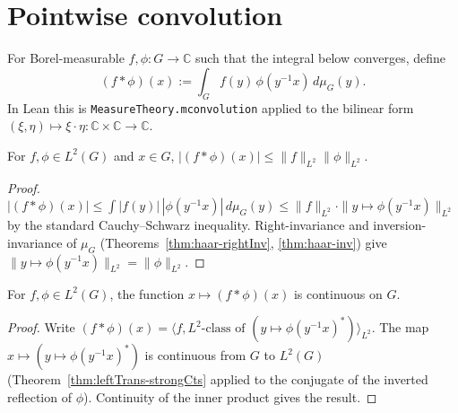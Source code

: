 \section{Pointwise convolution}

\begin{definition}
  \label{def:conv-ptwise}
  \leanok
  For Borel-measurable $f, \phi : G \to \mathbb C$ such that the integral
  below converges, define
  \[
     (f * \phi)(x) := \int_G f(y)\, \phi(y^{-1} x)\, d\mu_G(y).
  \]
  In Lean this is \texttt{MeasureTheory.mconvolution} applied to the
  bilinear form $(\xi, \eta) \mapsto \xi \cdot \eta : \mathbb C \times \mathbb C \to \mathbb C$.
\end{definition}

\begin{theorem}
  \label{thm:conv-CS}
  For $f, \phi \in L^2(G)$ and $x \in G$,
  $|(f*\phi)(x)| \leq \|f\|_{L^2}\|\phi\|_{L^2}$.
\end{theorem}

\begin{proof}
  $|(f*\phi)(x)| \leq \int |f(y)|\,|\phi(y^{-1}x)|\,d\mu_G(y)
    \leq \|f\|_{L^2} \cdot \|y\mapsto \phi(y^{-1}x)\|_{L^2}$
  by the standard Cauchy--Schwarz inequality.
  Right-invariance and inversion-invariance of $\mu_G$
  (Theorems~\ref{thm:haar-rightInv}, \ref{thm:haar-inv}) give
  $\|y \mapsto \phi(y^{-1}x)\|_{L^2} = \|\phi\|_{L^2}$.
\end{proof}

\begin{theorem}
  \label{thm:conv-cts}
  For $f, \phi \in L^2(G)$, the function $x \mapsto (f*\phi)(x)$ is
  continuous on $G$.
\end{theorem}

\begin{proof}
  Write $(f*\phi)(x) = \langle f, L^2\text{-class of }
  (y \mapsto \phi(y^{-1} x)^*)\rangle_{L^2}$. The map
  $x \mapsto (y \mapsto \phi(y^{-1} x)^*)$ is continuous from $G$ to
  $L^2(G)$ (Theorem~\ref{thm:leftTrans-strongCts} applied to the
  conjugate of the inverted reflection of $\phi$). Continuity of the
  inner product gives the result.
\end{proof}

